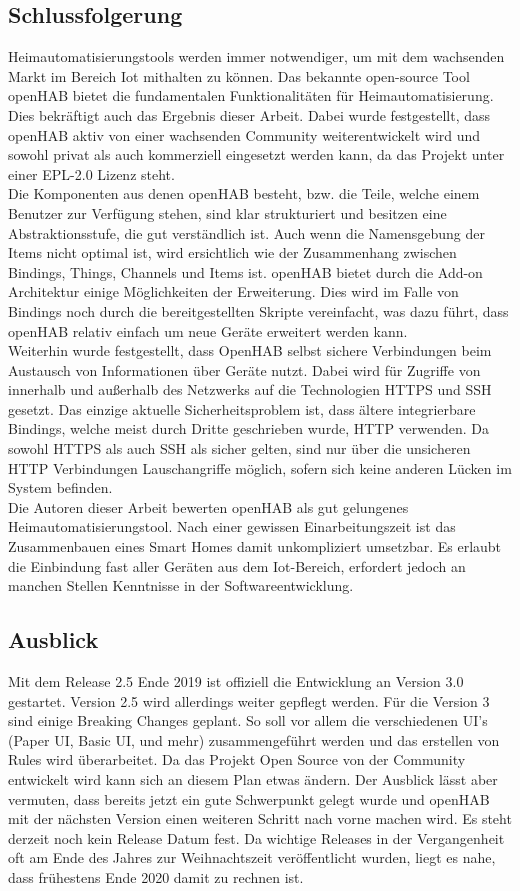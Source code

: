 \subsection{Schlussfolgerung}
Heimautomatisierungstools werden immer notwendiger, um mit dem wachsenden Markt im Bereich Iot mithalten zu können.\cite{STATISTA01:IOT} Das bekannte open-source Tool openHAB bietet die fundamentalen Funktionalitäten für Heimautomatisierung. Dies bekräftigt auch das Ergebnis dieser Arbeit. Dabei wurde festgestellt, dass openHAB aktiv von einer wachsenden Community weiterentwickelt wird und sowohl privat als auch kommerziell eingesetzt werden kann, da das Projekt unter einer EPL-2.0 Lizenz steht.\\
Die Komponenten aus denen openHAB besteht, bzw. die Teile, welche einem Benutzer zur Verfügung stehen, sind klar strukturiert und besitzen eine Abstraktionsstufe, die gut verständlich ist. Auch wenn die Namensgebung der Items nicht optimal ist, wird ersichtlich wie der Zusammenhang zwischen Bindings, Things, Channels und Items ist. openHAB bietet durch die Add-on Architektur einige Möglichkeiten der Erweiterung. Dies wird im Falle von Bindings noch durch die bereitgestellten Skripte vereinfacht, was dazu führt, dass openHAB relativ einfach um neue Geräte erweitert werden kann.\\
Weiterhin wurde festgestellt, dass OpenHAB selbst sichere Verbindungen beim Austausch von Informationen über Geräte nutzt. Dabei wird für Zugriffe von innerhalb und außerhalb des Netzwerks auf die Technologien HTTPS und SSH gesetzt. Das einzige aktuelle Sicherheitsproblem ist, dass ältere integrierbare Bindings, welche meist durch Dritte geschrieben wurde, HTTP verwenden. Da sowohl HTTPS als auch SSH als sicher gelten, sind nur über die unsicheren HTTP Verbindungen Lauschangriffe möglich, sofern sich keine anderen Lücken im System befinden.
\\
Die Autoren dieser Arbeit bewerten openHAB als gut gelungenes Heimautomatisierungstool. Nach einer gewissen Einarbeitungszeit ist das Zusammenbauen eines Smart Homes damit unkompliziert umsetzbar. Es erlaubt die Einbindung fast aller Geräten aus dem Iot-Bereich, erfordert jedoch an manchen Stellen Kenntnisse in der Softwareentwicklung.


\subsection{Ausblick}
Mit dem Release 2.5 Ende 2019 ist offiziell die Entwicklung an Version 3.0 gestartet. Version 2.5 wird allerdings weiter gepflegt werden. Für die Version 3 sind einige Breaking Changes geplant. So soll vor allem die verschiedenen UI's (Paper UI, Basic UI, und mehr) zusammengeführt werden und das erstellen von Rules wird überarbeitet.\cite{OPENHAB02:OH} Da das Projekt Open Source von der Community entwickelt wird kann sich an diesem Plan etwas ändern. Der Ausblick lässt aber vermuten, dass bereits jetzt ein gute Schwerpunkt gelegt wurde und openHAB mit der nächsten Version einen weiteren Schritt nach vorne machen wird. Es steht derzeit noch kein Release Datum fest. Da wichtige Releases in der Vergangenheit oft am Ende des Jahres zur Weihnachtszeit veröffentlicht wurden, liegt es nahe, dass frühestens Ende 2020 damit zu rechnen ist.

